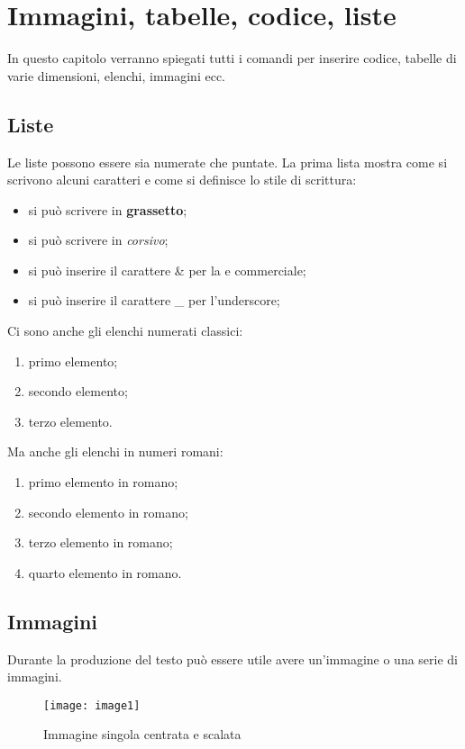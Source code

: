 \chapter{Immagini, tabelle, codice, liste}
In questo capitolo verranno spiegati tutti i comandi per inserire codice, tabelle di varie dimensioni, elenchi, immagini ecc.


\section{Liste}
Le liste possono essere sia numerate che puntate. La prima lista mostra come si scrivono alcuni caratteri e come si definisce lo stile di scrittura:
\begin{itemize}
    \item si può scrivere in \textbf{grassetto};
    \item si può scrivere in \textit{corsivo};
    \item si può inserire il carattere \& per la e commerciale;
    \item si può inserire il carattere \_ per l'underscore;
\end{itemize}

Ci sono anche gli elenchi numerati classici:
\begin{enumerate}
    \item primo elemento;
    \item secondo elemento;
    \item terzo elemento.
\end{enumerate}

Ma anche gli elenchi in numeri romani:
\begin{enumerate}[I]    %
    \item primo elemento in romano;
    \item secondo elemento in romano;
    \item terzo elemento in romano;
    \item quarto elemento in romano.
\end{enumerate}


\section{Immagini}
Durante la produzione del testo può essere utile avere un'immagine o una serie di immagini.

\begin{figure}[H]
	\centering
	\texttt{[image: image1]} %
	\caption{Immagine singola centrata e scalata \cite{unsplashImage1}}
	\label{capitolo2:image1}
\end{figure}

